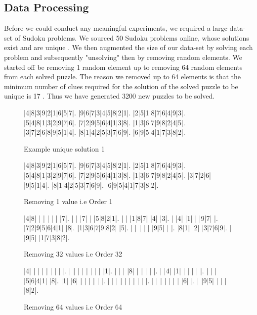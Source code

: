 \documentclass[a4paper]{article}
\begin{document}
\subsection{Data Processing}
Before we could conduct any meaningful experiments, we required a large data-set of Sudoku problems. We sourced 50 Sudoku problems online, whose solutions exist and are unique \cite{fontaine_2012}. We then augmented the size of our data-set by solving each problem and subsequently "unsolving" then by removing random elements. We started off be removing 1 random element up to removing 64 random elements from each solved puzzle. The reason we removed up to 64 elements is that the minimum number of clues required for the solution of the solved puzzle to be unique is 17 \cite{sudoku_17}. Thus we have generated 3200 new puzzles to be solved.
\newline
\begin{figure}[H]
\centering
 \setlength\sudokusize{4cm}
 \renewcommand\sudokuformat[1]{\sffamily#1}
\begin{sudoku}
|4|8|3|9|2|1|6|5|7|.
|9|6|7|3|4|5|8|2|1|.
|2|5|1|8|7|6|4|9|3|.
|5|4|8|1|3|2|9|7|6|.
|7|2|9|5|6|4|1|3|8|.
|1|3|6|7|9|8|2|4|5|.
|3|7|2|6|8|9|5|1|4|.
|8|1|4|2|5|3|7|6|9|.
|6|9|5|4|1|7|3|8|2|.
\end{sudoku}
\caption{Example unique solution 1}
\end{figure}
\begin{figure}[H]
\centering
 \setlength\sudokusize{4cm}
 \renewcommand\sudokuformat[1]{\sffamily#1}
\begin{sudoku}
|4|8|3|9|2|1|6|5|7|.
|9|6|7|3|4|5|8|2|1|.
|2|5|1|8|7|6|4|9|3|.
|5|4|8|1|3|2|9|7|6|.
|7|2|9|5|6|4|1|3|8|.
|1|3|6|7|9|8|2|4|5|.
|3|7|2|6| |9|5|1|4|.
|8|1|4|2|5|3|7|6|9|.
|6|9|5|4|1|7|3|8|2|.
\end{sudoku}
\caption{Removing 1 value i.e Order 1}
\end{figure}

\begin{figure}[H]
\centering
 \setlength\sudokusize{4cm}
 \renewcommand\sudokuformat[1]{\sffamily#1}
\begin{sudoku}
|4|8| | | | | | |7|.
| | |7| | |5|8|2|1|.
| | |1|8|7| |4| |3|.
| |4| |1| | |9|7| |.
|7|2|9|5|6|4|1| |8|.
|1|3|6|7|9|8|2| |5|.
| | | | | |9|5| | |.
|8|1| |2| |3|7|6|9|.
| |9|5| |1|7|3|8|2|.
\end{sudoku}
\caption{Removing 32 values i.e Order 32}
\end{figure}

\begin{figure}[H]
\centering
 \setlength\sudokusize{4cm}
 \renewcommand\sudokuformat[1]{\sffamily#1}
\begin{sudoku}
|4| | | | | | | | |.
| | | | | | | | |1|.
| | | |8| | | | | |.
| |4| |1| | | | | |.
| | | |5|6|4|1| |8|.
|1| |6| | | | | | |.
| | | | | | | | | |.
| | | | | | | |6| |.
| |9|5| | | | |8|2|.
\end{sudoku}
\caption{Removing 64 values i.e Order 64}
\end{figure}
\end{document}

